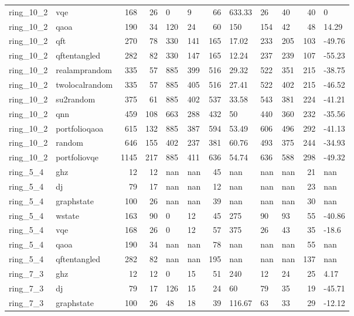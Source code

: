 \begin{longtable}{llrrllrlllrl}
ring\_10\_2 & vqe & 168 & 26 & 0 & 9 & 66 & 633.33 & 26 & 40 & 40 & 0 \\
ring\_10\_2 & qaoa & 190 & 34 & 120 & 24 & 60 & 150 & 154 & 42 & 48 & 14.29 \\
ring\_10\_2 & qft & 270 & 78 & 330 & 141 & 165 & 17.02 & 233 & 205 & 103 & -49.76 \\
ring\_10\_2 & qftentangled & 282 & 82 & 330 & 147 & 165 & 12.24 & 237 & 239 & 107 & -55.23 \\
ring\_10\_2 & realamprandom & 335 & 57 & 885 & 399 & 516 & 29.32 & 522 & 351 & 215 & -38.75 \\
ring\_10\_2 & twolocalrandom & 335 & 57 & 885 & 405 & 516 & 27.41 & 522 & 402 & 215 & -46.52 \\
ring\_10\_2 & su2random & 375 & 61 & 885 & 402 & 537 & 33.58 & 543 & 381 & 224 & -41.21 \\
ring\_10\_2 & qnn & 459 & 108 & 663 & 288 & 432 & 50 & 440 & 360 & 232 & -35.56 \\
ring\_10\_2 & portfolioqaoa & 615 & 132 & 885 & 387 & 594 & 53.49 & 606 & 496 & 292 & -41.13 \\
ring\_10\_2 & random & 646 & 155 & 402 & 237 & 381 & 60.76 & 493 & 375 & 244 & -34.93 \\
ring\_10\_2 & portfoliovqe & 1145 & 217 & 885 & 411 & 636 & 54.74 & 636 & 588 & 298 & -49.32 \\
ring\_5\_4 & ghz & 12 & 12 & nan & nan & 45 & nan & nan & nan & 21 & nan \\
ring\_5\_4 & dj & 79 & 17 & nan & nan & 12 & nan & nan & nan & 23 & nan \\
ring\_5\_4 & graphstate & 100 & 26 & nan & nan & 39 & nan & nan & nan & 30 & nan \\
ring\_5\_4 & wstate & 163 & 90 & 0 & 12 & 45 & 275 & 90 & 93 & 55 & -40.86 \\
ring\_5\_4 & vqe & 168 & 26 & 0 & 12 & 57 & 375 & 26 & 43 & 35 & -18.6 \\
ring\_5\_4 & qaoa & 190 & 34 & nan & nan & 78 & nan & nan & nan & 55 & nan \\
ring\_5\_4 & qftentangled & 282 & 82 & nan & nan & 195 & nan & nan & nan & 137 & nan \\
ring\_7\_3 & ghz & 12 & 12 & 0 & 15 & 51 & 240 & 12 & 24 & 25 & 4.17 \\
ring\_7\_3 & dj & 79 & 17 & 126 & 15 & 24 & 60 & 79 & 35 & 19 & -45.71 \\
ring\_7\_3 & graphstate & 100 & 26 & 48 & 18 & 39 & 116.67 & 63 & 33 & 29 & -12.12 \\

\end{longtable}
